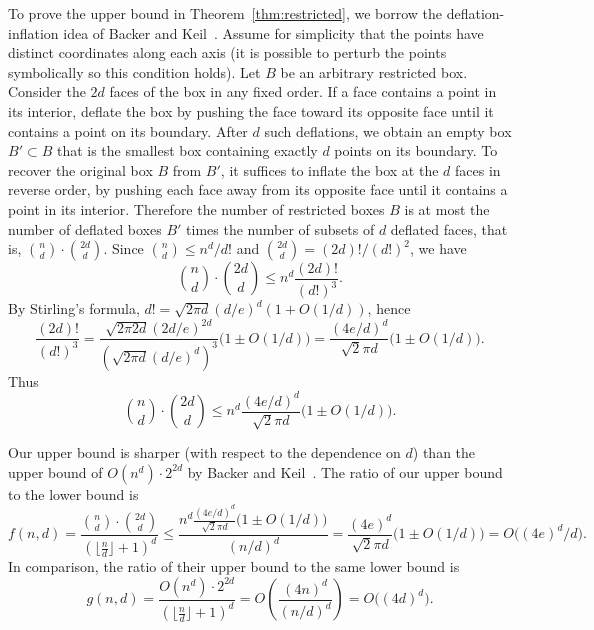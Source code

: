 \documentclass[11pt]{article}
\begin{document}
To prove the upper bound in Theorem~\ref{thm:restricted},
we borrow the deflation-inflation idea of Backer and Keil~\cite{BK09a,BK09b}.
Assume for simplicity that
the points have distinct coordinates along each axis
(it is possible to perturb the points symbolically so this condition holds).
Let $B$ be an arbitrary restricted box.
Consider the $2d$ faces of the box in any fixed order.
If a face contains a point in its interior,
deflate the box by pushing the face toward its opposite face
until it contains a point on its boundary.
After $d$ such deflations,
we obtain an empty box $B'\subset B$ that is the smallest box containing
exactly $d$ points on its boundary.
To recover the original box $B$ from $B'$,
it suffices to inflate the box at the $d$ faces in reverse order,
by pushing each face away from its opposite face until
it contains a point in its interior.
Therefore the number of restricted boxes $B$ is at most
the number of deflated boxes $B'$ times the number of subsets of $d$
deflated faces, that is, ${n \choose d} \cdot {2d \choose d}$.
Since 
${n \choose d} \le n^d / d!$
and
${2d \choose d} = (2d)! / (d!)^2$,
we have
$$
{n \choose d} \cdot {2d \choose d}
\le n^d\frac{(2d)!}{(d!)^3}.
$$
By Stirling's formula, $d! = \sqrt{2\pi d} (d/e)^d (1 + O(1/d))$,
hence 
$$
\frac{(2d)!}{(d!)^3}
= \frac{\sqrt{2\pi 2d} (2d/e)^{2d}}{(\sqrt{2\pi d} (d/e)^d)^3}
	\big(1 \pm O(1/d)\big)
= \frac{(4e/d)^d}{\sqrt2 \pi d}
	\big(1 \pm O(1/d)\big).
$$
Thus
$$
{n \choose d} \cdot {2d \choose d}
\le n^d \frac{(4e/d)^d}{\sqrt2 \pi d}
	\big(1 \pm O(1/d)\big).
$$


Our upper bound is sharper (with respect to the dependence on $d$)
than the upper bound of $O(n^d) \cdot 2^{2d}$ by Backer and 
Keil~\cite{BK09a,BK09b}. The ratio of our upper bound to the lower bound is
$$
f(n,d)
= \frac{{n \choose d} \cdot {2d \choose d}}{(\lfloor \frac{n}{d} \rfloor + 1)^d}
\le \frac{n^d \frac{(4e/d)^d}{\sqrt2 \pi d} \big(1 \pm O(1/d)\big)}{(n/d)^d}
= \frac{(4e)^d}{\sqrt2 \pi d} \big(1 \pm O(1/d)\big)
= O\big((4e)^d/d\big).
$$
In comparison, the ratio of their upper bound to the same lower bound is 
$$
g(n,d)
= \frac{O(n^d) \cdot 2^{2d}}{(\lfloor \frac{n}{d} \rfloor + 1)^d}
= O\left(\frac{(4n)^d}{(n/d)^d}\right)
= O\big((4d)^d\big).
$$
\end{document}
